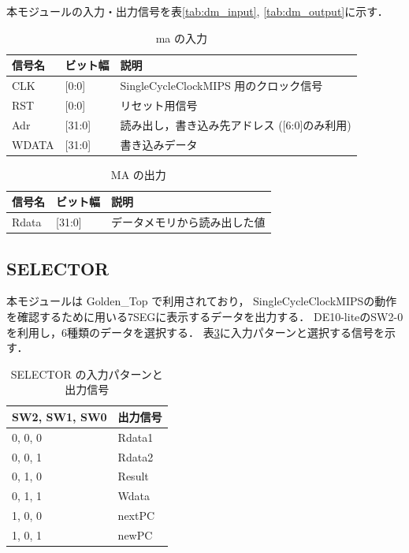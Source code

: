 本モジュールの入力・出力信号を表\ref{tab:dm_input}, \ref{tab:dm_output}に示す．
\begin{table}[h]
  \caption{ma の入力}
  \centering
  \begin{tabular}{l|l|l}
    信号名 & ビット幅 & 説明 \\
    \hline
    CLK & [0:0] & SingleCycleClockMIPS 用のクロック信号 \\
    RST & [0:0] & リセット用信号 \\
    Adr & [31:0] & 読み出し，書き込み先アドレス ([6:0]のみ利用) \\
    WDATA & [31:0] & 書き込みデータ \\
  \end{tabular}
  \label{tab:ma_input}
\end{table}
\begin{table}[h]
  \caption{MA の出力}
  \centering
  \begin{tabular}{l|l|l}
    信号名 & ビット幅 & 説明 \\
    \hline
    Rdata & [31:0] & データメモリから読み出した値 \\
  \end{tabular}
  \label{tab:ma_output}
\end{table}

\subsection{SELECTOR}
本モジュールは Golden\_Top で利用されており，
SingleCycleClockMIPSの動作を確認するために用いる7SEGに表示するデータを出力する．
DE10-liteのSW2-0を利用し，6種類のデータを選択する．
表\ref{tab:selector}に入力パターンと選択する信号を示す．
\begin{table}
  \caption{SELECTOR の入力パターンと出力信号}
  \centering
  \begin{tabular}{l|l}
    SW2, SW1, SW0 & 出力信号 \\
    \hline
    0, 0, 0 & Rdata1 \\
    0, 0, 1 & Rdata2 \\
    0, 1, 0 & Result \\
    0, 1, 1 & Wdata \\
    1, 0, 0 & nextPC \\
    1, 0, 1 & newPC \\
  \end{tabular}
  \label{tab:selector}
\end{table}

